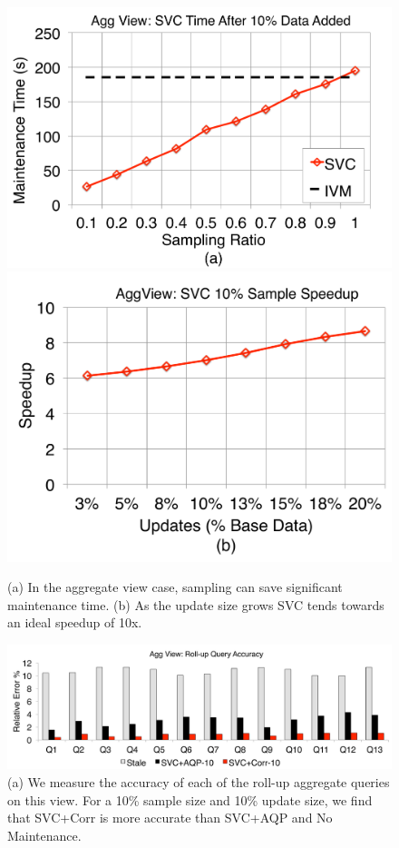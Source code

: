 \begin{figure}[t]
\centering
 \includegraphics[scale=0.15]{exp/msdc_1.pdf}
 \includegraphics[scale=0.15]{exp/msdc_2.pdf}
   \caption{(a) In the aggregate view case, sampling can save significant maintenance time. (b) As the update size grows SVC tends towards an ideal speedup of 10x.\label{exp2-acc-sample}}
\end{figure}


\begin{figure}[t]
\centering
 \includegraphics[scale=0.13]{exp/msdc_3.pdf}
   \caption{(a) We measure the accuracy of each of the roll-up aggregate queries on this view. For a 10\% sample size and 10\% update size, we find that SVC+Corr is more accurate than SVC+AQP and No Maintenance.\label{exp2-acc-sample2}}
\end{figure}



